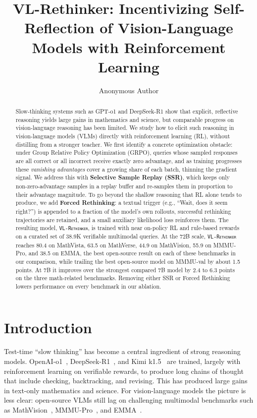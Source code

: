 \documentclass{article}
\title{VL-Rethinker: Incentivizing Self-Reflection of Vision-Language Models with Reinforcement Learning}
\author{Anonymous Author}
\newcommand{\model}{\texttt{\textsc{VL-Rethinker}}\xspace}
\begin{document}
\maketitle

\begin{abstract}
Slow-thinking systems such as GPT-o1 and DeepSeek-R1 show that explicit, reflective reasoning yields large gains in mathematics and science, but comparable progress on vision-language reasoning has been limited. We study how to elicit such reasoning in vision-language models (VLMs) directly with reinforcement learning (RL), without distilling from a stronger teacher. We first identify a concrete optimization obstacle: under Group Relative Policy Optimization (GRPO), queries whose sampled responses are all correct or all incorrect receive exactly zero advantage, and as training progresses these \emph{vanishing advantages} cover a growing share of each batch, thinning the gradient signal. We address this with \textbf{Selective Sample Replay (SSR)}, which keeps only non-zero-advantage samples in a replay buffer and re-samples them in proportion to their advantage magnitude. To go beyond the shallow reasoning that RL alone tends to produce, we add \textbf{Forced Rethinking}: a textual trigger (e.g., ``Wait, does it seem right?'') is appended to a fraction of the model's own rollouts, successful rethinking trajectories are retained, and a small auxiliary likelihood loss reinforces them. The resulting model, \model, is trained with near on-policy RL and rule-based rewards on a curated set of 38.9K verifiable multimodal queries. At the 72B scale, \model reaches 80.4 on MathVista, 63.5 on MathVerse, 44.9 on MathVision, 55.9 on MMMU-Pro, and 38.5 on EMMA, the best open-source result on each of these benchmarks in our comparison, while trailing the best open-source model on MMMU-val by about 1.5 points. At 7B it improves over the strongest compared 7B model by 2.4 to 6.3 points on the three math-related benchmarks. Removing either SSR or Forced Rethinking lowers performance on every benchmark in our ablation.
\end{abstract}

\section{Introduction}
\label{sec:intro}

Test-time ``slow thinking'' has become a central ingredient of strong reasoning models. OpenAI-o1~\citep{openai-o1}, DeepSeek-R1~\citep{deepseek-r1}, and Kimi k1.5~\citep{kimi-1_5} are trained, largely with reinforcement learning on verifiable rewards, to produce long chains of thought that include checking, backtracking, and revising. This has produced large gains in text-only mathematics and science. For vision-language models the picture is less clear: open-source VLMs still lag on challenging multimodal benchmarks such as MathVision~\citep{mathvision}, MMMU-Pro~\citep{mmmupro}, and EMMA~\citep{emma}.
\end{document}

